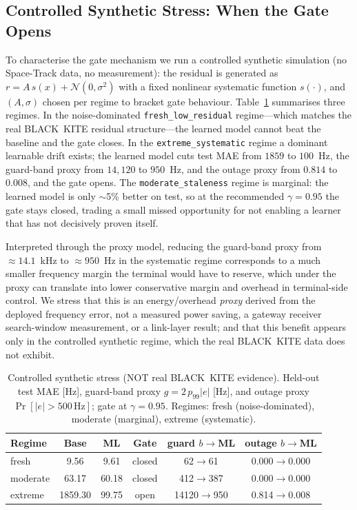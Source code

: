 \documentclass[conference]{IEEEtran}
\begin{document}
\subsection{Controlled Synthetic Stress: When the Gate Opens}
\label{sec:eval-stress}
To characterise the gate mechanism we run a controlled synthetic simulation
(no Space-Track data, no measurement): the residual is generated as
$r = A\,s(x) + \mathcal{N}(0,\sigma^2)$ with a fixed nonlinear systematic
function $s(\cdot)$, and $(A,\sigma)$ chosen per regime to bracket gate
behaviour. Table~\ref{tab:stress} summarises three regimes. In the
noise-dominated \texttt{fresh\_low\_residual} regime---which matches the real
BLACK~KITE residual structure---the learned model cannot beat the baseline and
the gate closes. In the \texttt{extreme\_systematic} regime a dominant learnable
drift exists; the learned model cuts test MAE from $1859$ to $100$~Hz, the
guard-band proxy from $14{,}120$ to $950$~Hz, and the outage proxy from $0.814$
to $0.008$, and the gate opens. The \texttt{moderate\_staleness} regime is
marginal: the learned model is only $\sim$5\% better on test, so at the
recommended $\gamma=0.95$ the gate stays closed, trading a small missed
opportunity for not enabling a learner that has not decisively proven itself.

Interpreted through the proxy model, reducing the guard-band proxy from
$\approx 14.1$~kHz to $\approx 950$~Hz in the systematic regime corresponds to a
much smaller frequency margin the terminal would have to reserve, which under the
proxy can translate into lower conservative margin and overhead in terminal-side
control. We stress that this is an energy/overhead \emph{proxy} derived from the
deployed frequency error, not a measured power saving, a gateway receiver
search-window measurement, or a link-layer result; and that this benefit appears
only in the controlled synthetic regime, which the real BLACK~KITE data does not
exhibit.

\begin{table}[t]
\centering
\footnotesize
\setlength{\tabcolsep}{3.5pt}
\caption{Controlled synthetic stress (NOT real BLACK~KITE evidence). Held-out
test MAE [Hz], guard-band proxy $g=2\,p_{99}|e|$ [Hz], and outage proxy
$\Pr[|e|>500\,\mathrm{Hz}]$; gate at $\gamma=0.95$. Regimes: fresh
(noise-dominated), moderate (marginal), extreme (systematic).}
\label{tab:stress}
\begin{tabular}{lccccc}
\toprule
Regime & Base & ML & Gate & guard $b{\to}$ML & outage $b{\to}$ML \\
\midrule
fresh    & 9.56 & 9.61 & closed & 62$\to$61 & 0.000$\to$0.000 \\
moderate & 63.17 & 60.18 & closed & 412$\to$387 & 0.000$\to$0.000 \\
extreme  & 1859.30 & 99.75 & open & 14120$\to$950 & 0.814$\to$0.008 \\
\bottomrule
\end{tabular}
\end{table}
\end{document}
